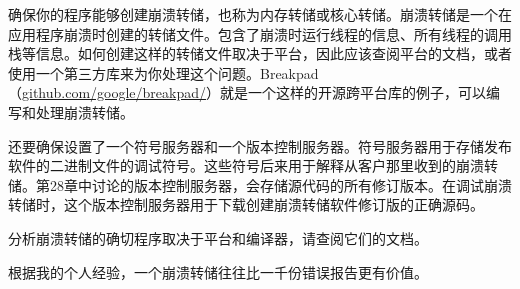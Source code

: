 
确保你的程序能够创建崩溃转储，也称为内存转储或核心转储。崩溃转储是一个在应用程序崩溃时创建的转储文件。包含了崩溃时运行线程的信息、所有线程的调用栈等信息。如何创建这样的转储文件取决于平台，因此应该查阅平台的文档，或者使用一个第三方库来为你处理这个问题。Breakpad（\url{github.com/google/breakpad/}）就是一个这样的开源跨平台库的例子，可以编写和处理崩溃转储。

还要确保设置了一个符号服务器和一个版本控制服务器。符号服务器用于存储发布软件的二进制文件的调试符号。这些符号后来用于解释从客户那里收到的崩溃转储。第28章中讨论的版本控制服务器，会存储源代码的所有修订版本。在调试崩溃转储时，这个版本控制服务器用于下载创建崩溃转储软件修订版的正确源码。

分析崩溃转储的确切程序取决于平台和编译器，请查阅它们的文档。

根据我的个人经验，一个崩溃转储往往比一千份错误报告更有价值。

















